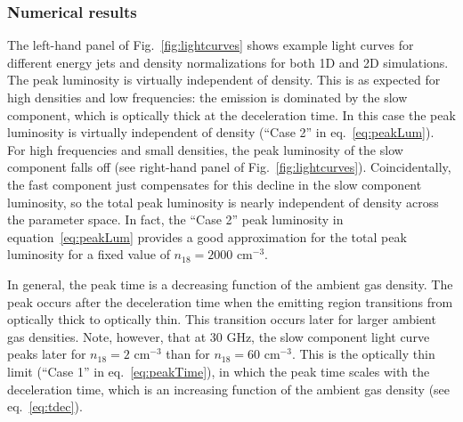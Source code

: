 \documentclass[usenatbib,fleqn]{mnras}
\begin{document}
\subsubsection{Numerical results}
The left-hand panel of Fig.~\ref{fig:lightcurves} shows example light
curves for different energy jets and density normalizations for both
1D and 2D simulations. The peak luminosity is virtually independent of
density.  This is as expected for high densities and low frequencies:
the emission is dominated by the slow component, which is optically
thick at the deceleration time. In this case the peak luminosity is
virtually independent of density (``Case 2'' in
eq.~\ref{eq:peakLum}). For high frequencies and small densities, the
peak luminosity of the slow component falls off (see right-hand panel
of Fig.~\ref{fig:lightcurves}). Coincidentally, the fast component
just compensates for this decline in the slow component luminosity, so
the total peak luminosity is nearly independent of density across the
parameter space. In fact, the ``Case 2'' peak luminosity in
equation~\ref{eq:peakLum} provides a good approximation for the total
peak luminosity for a fixed value of $n_{18}=2000$ cm$^{-3}$.

In general, the peak time is a decreasing function of the ambient gas
density. The peak occurs after the deceleration time when the emitting
region transitions from optically thick to optically thin. This
transition occurs later for larger ambient gas densities. Note,
however, that at 30 GHz, the slow component light curve peaks later
for $n_{18}=2$ cm$^{-3}$ than for $n_{18}=60$ cm$^{-3}$. This is the
optically thin limit (``Case 1'' in eq.~\ref{eq:peakTime}), in which
the peak time scales with the deceleration time, which is an
increasing function of the ambient gas density (see
eq.~\ref{eq:tdec}).
\end{document}
